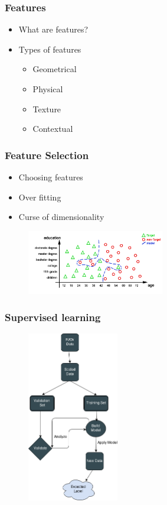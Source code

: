 \documentclass{beamer}
\begin{document}

\begin{frame}
\frametitle{Features}
\begin{itemize}
	\item What are features?
	\item Types of features \begin{itemize}
					\item Geometrical %
					\item Physical %
					\item Texture %
					\item Contextual  %
					\end{itemize}
				
\end{itemize}

\end{frame}


\begin{frame}
\frametitle{Feature Selection}
\begin{itemize}
	\item Choosing features
	\item Over fitting 
	\item Curse of dimensionality
\end{itemize}
\begin{figure}
	\centering
    \includegraphics[width=60mm,scale=1.5]{./img/overfit.png}
\end{figure}
\end{frame}

\begin{frame}
\frametitle{Supervised learning}

\begin{figure}
	\centering
    \includegraphics[width=40mm,scale=1]{./img/SL.png}
\end{figure}

\end{frame}
\end{document}
